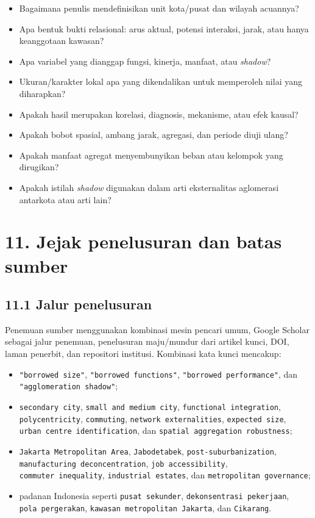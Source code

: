 \documentclass[
  indonesian,
  11pt,
  a4paper,
  oneside,
  openany]{report}
\providecommand{\tightlist}{%
  \setlength{\itemsep}{0pt}\setlength{\parskip}{0pt}}
\begin{document}
\begin{itemize}
\tightlist
\item
  Bagaimana penulis mendefinisikan unit kota/pusat dan wilayah acuannya?
\item
  Apa bentuk bukti relasional: arus aktual, potensi interaksi, jarak,
  atau hanya keanggotaan kawasan?
\item
  Apa variabel yang dianggap fungsi, kinerja, manfaat, atau
  \emph{shadow}?
\item
  Ukuran/karakter lokal apa yang dikendalikan untuk memperoleh nilai
  yang diharapkan?
\item
  Apakah hasil merupakan korelasi, diagnosis, mekanisme, atau efek
  kausal?
\item
  Apakah bobot spasial, ambang jarak, agregasi, dan periode diuji ulang?
\item
  Apakah manfaat agregat menyembunyikan beban atau kelompok yang
  dirugikan?
\item
  Apakah istilah \emph{shadow} digunakan dalam arti eksternalitas
  aglomerasi antarkota atau arti lain?
\end{itemize}

\section{11. Jejak penelusuran dan batas
sumber}\label{jejak-penelusuran-dan-batas-sumber}

\subsection{11.1 Jalur penelusuran}\label{jalur-penelusuran}

Penemuan sumber menggunakan kombinasi mesin pencari umum, Google Scholar
sebagai jalur penemuan, penelusuran maju/mundur dari artikel kunci, DOI,
laman penerbit, dan repositori institusi. Kombinasi kata kunci mencakup:

\begin{itemize}
\tightlist
\item
  \texttt{"borrowed\ size"}, \texttt{"borrowed\ functions"},
  \texttt{"borrowed\ performance"}, dan
  \texttt{"agglomeration\ shadow"};
\item
  \texttt{secondary\ city}, \texttt{small\ and\ medium\ city},
  \texttt{functional\ integration}, \texttt{polycentricity},
  \texttt{commuting}, \texttt{network\ externalities},
  \texttt{expected\ size}, \texttt{urban\ centre\ identification}, dan
  \texttt{spatial\ aggregation\ robustness};
\item
  \texttt{Jakarta\ Metropolitan\ Area}, \texttt{Jabodetabek},
  \texttt{post-suburbanization},
  \texttt{manufacturing\ deconcentration}, \texttt{job\ accessibility},
  \texttt{commuter\ inequality}, \texttt{industrial\ estates}, dan
  \texttt{metropolitan\ governance};
\item
  padanan Indonesia seperti \texttt{pusat\ sekunder},
  \texttt{dekonsentrasi\ pekerjaan}, \texttt{pola\ pergerakan},
  \texttt{kawasan\ metropolitan\ Jakarta}, dan \texttt{Cikarang}.
\end{itemize}
\end{document}
